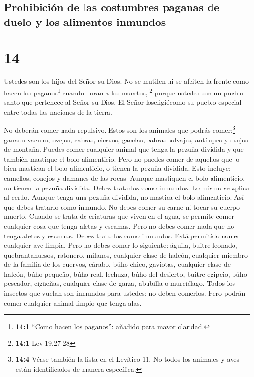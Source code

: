 \hypertarget{prohibiciuxf3n-de-las-costumbres-paganas-de-duelo-y-los-alimentos-inmundos}{%
\subsection{Prohibición de las costumbres paganas de duelo y los
alimentos
inmundos}\label{prohibiciuxf3n-de-las-costumbres-paganas-de-duelo-y-los-alimentos-inmundos}}

\hypertarget{section-13}{%
\section{14}\label{section-13}}

 Ustedes son los hijos del Señor su Dios. No se mutilen ni
se afeiten la frente como hacen los paganos\footnote{\textbf{14:1}
  ``Como hacen los paganos'': añadido para mayor claridad.} cuando
lloran a los muertos, \footnote{\textbf{14:1} Lev 19,27-28}
 porque ustedes son un pueblo santo que pertenece al Señor
su Dios. El Señor loseligiócomo su pueblo especial entre todas las
naciones de la tierra.

 No deberán comer nada repulsivo.  Estos son
los animales que podrás comer:\footnote{\textbf{14:4} Véase también la
  lista en el Levítico 11. No todos los animales y aves están
  identificados de manera específica.} ganado vacuno, ovejas, cabras,
 ciervos, gacelas, cabras salvajes, antílopes y ovejas de
montaña.  Puedes comer cualquier animal que tenga la
pezuña dividida y que también mastique el bolo alimenticio.
 Pero no puedes comer de aquellos que, o bien mastican el
bolo alimenticio, o tienen la pezuña dividida. Esto incluye: camellos,
conejos y damanes de las rocas. Aunque mastiquen el bolo alimenticio, no
tienen la pezuña dividida. Debes tratarlos como inmundos. 
Lo mismo se aplica al cerdo. Aunque tenga una pezuña dividida, no
mastica el bolo alimenticio. Así que debes tratarlo como inmundo. No
debes comer su carne ni tocar su cuerpo muerto.  Cuando se
trata de criaturas que viven en el agua, se permite comer cualquier cosa
que tenga aletas y escamas.  Pero no debes comer nada que
no tenga aletas y escamas. Debes tratarlos como inmundos.
 Está permitido comer cualquier ave limpia.
 Pero no debes comer lo siguiente: águila, buitre
leonado, quebrantahuesos,  ratonero, milanos, cualquier
clase de halcón,  cualquier miembro de la familia de los
cuervos,  cárabo, búho chico, gaviotas, cualquier clase
de halcón,  búho pequeño, búho real, lechuza,
 búho del desierto, buitre egipcio, búho pescador,
 cigüeñas, cualquier clase de garza, abubilla o
murciélago.  Todos los insectos que vuelan son inmundos
para ustedes; no deben comerlos.  Pero podrán comer
cualquier animal limpio que tenga alas.

